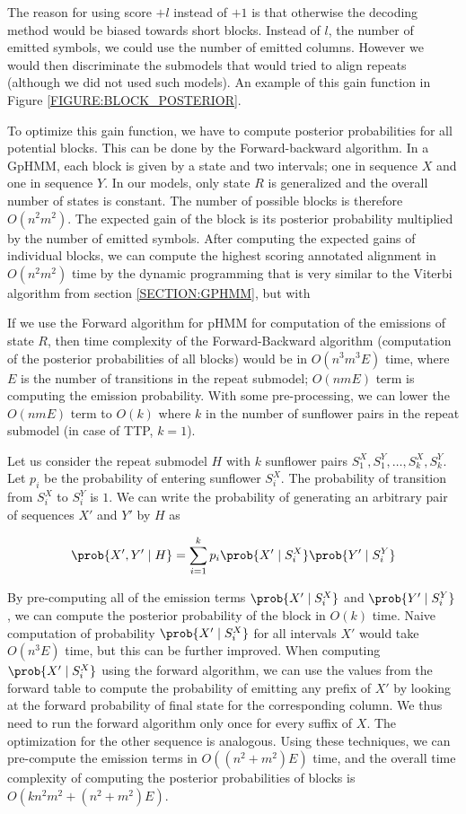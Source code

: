 The reason for using score $+l$ instead of $+1$ is that otherwise the decoding method
would be biased towards short blocks. Instead of $l$, the number of emitted
symbols, we could use the number of emitted columns. However we would then
discriminate the submodels that would tried to align repeats (although we did
not used such models). An example of this gain function in Figure
\ref{FIGURE:BLOCK_POSTERIOR}.

To optimize this gain function, we have to compute posterior probabilities for
all potential blocks. This can be done by the Forward-backward algorithm. In
a GpHMM, each block is given by a state and two intervals; one in
sequence $X$ and one in sequence $Y$. In our models, only state $R$ is
generalized and the overall number of states is constant. The number of
possible blocks is therefore $O(n^2m^2)$. The expected gain of the block 
is its posterior probability multiplied by the number of emitted symbols. After
computing the expected gains of individual blocks, we can compute the highest
scoring annotated alignment in $O(n^2m^2)$ time by the dynamic programming that
is very similar to the Viterbi algorithm from section \ref{SECTION:GPHMM}, but
with 

If we use the Forward algorithm for pHMM for computation of the emissions of
state $R$, then time complexity of the Forward-Backward algorithm (computation
of the posterior probabilities of all blocks) would be in $O(n^3m^3E)$ time,
where $E$ is the number of transitions in the repeat submodel; $O(nmE)$ term is
computing the emission probability. With some pre-processing, we can lower the
$O(nmE)$ term to $O(k)$ where $k$ in the number of sunflower pairs in the
repeat submodel (in case of TTP, $k=1$).

Let us consider the repeat submodel $H$ with $k$ sunflower pairs $S^X_1, S^Y_1,
\dots, S^X_k, S^Y_k$. Let $p_i$ be the probability of entering sunflower
$S^X_i$.  The probability of transition from $S^X_i$ to $S^Y_i$ is $1$. We can
write the probability of generating an arbitrary pair of sequences $X'$ and
$Y'$ by $H$ as

\begin{equation}
\prob{X', Y'\mid H} = \sum_{i=1}^k p_i\prob{X'\mid S^X_i}\prob{Y'\mid S^Y_i}
\end{equation}

By pre-computing all of the emission terms $\prob{X'\mid S^X_i}$ and $\prob{Y'\mid
S^Y_i}$, we can compute the posterior probability of the block in $O(k)$ time.
Naive computation of probability $\prob{X'\mid S^X_i}$ for all intervals $X'$
would take $O(n^3E)$ time, but this can be further improved. When computing
$\prob{X'\mid S^X_i}$ using the forward algorithm, we can use the values from
the forward table to compute the probability of emitting any prefix of $X'$ by
looking at the forward probability of final state for the corresponding column.
We thus need to run the forward algorithm only once for every suffix of $X$.
The optimization for the other sequence is analogous. Using these techniques,
we can pre-compute the emission terms in $O((n^2+m^2)E)$ time, and the overall
time complexity of computing the posterior probabilities of blocks is
$O(kn^2m^2 + (n^2+m^2)E)$. 

